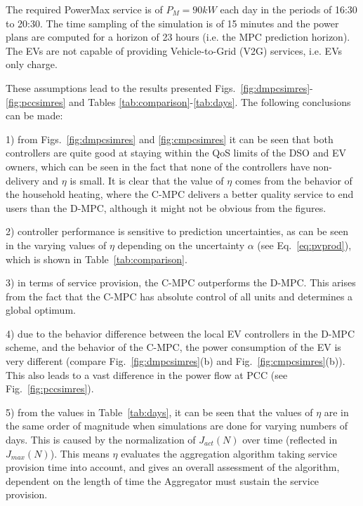 The required PowerMax service is of $P_M = 90kW $ each day in the periods of 16:30 to 20:30.
The time sampling of the simulation is of 15 minutes and the power plans are computed for a horizon of 23 hours (i.e. the MPC prediction horizon).
The EVs are not capable of providing Vehicle-to-Grid (V2G) services, i.e. EVs only charge.

These assumptions lead to the results presented Figs.~\ref{fig:dmpcsimres}-\ref{fig:pccsimres} and Tables \ref{tab:comparison}-\ref{tab:days}.
The following conclusions can be made:

1) from Figs.~\ref{fig:dmpcsimres} and \ref{fig:cmpcsimres} it can be seen that both controllers are quite good at staying within the QoS limits of the DSO and EV owners, which can be seen in the fact that none of the controllers have non-delivery and $\eta$ is small. It is clear that the value of $\eta$ comes from the behavior of the household heating, where the C-MPC delivers a better quality service to end users than the D-MPC, although it might not be obvious from the figures. %

2) controller performance is sensitive to prediction uncertainties, as can be seen in the varying values of $\eta$ depending on the uncertainty $\alpha$ (see Eq.~\eqref{eq:pvprod}), which is shown in Table~\ref{tab:comparison}.

3) in terms of service provision, the C-MPC outperforms the D-MPC. This arises from the fact that the C-MPC has absolute control of all units and determines a global optimum.

4) due to the behavior difference between the local EV controllers in the D-MPC scheme, and the behavior of the C-MPC, the power consumption of the EV is very different (compare Fig.~\ref{fig:dmpcsimres}(b) and Fig.~\ref{fig:cmpcsimres}(b)). This also leads to a vast difference in the power flow at PCC (see Fig.~\ref{fig:pccsimres}).

5) from the values in Table~\ref{tab:days}, it can be seen that the values of $\eta$ are in the same order of magnitude when simulations are done for varying numbers of days. This is caused by the normalization of $J_{act}(N)$ over time (reflected in $J_{max}(N)$). This means $\eta$ evaluates the aggregation algorithm taking service provision time into account, and gives an overall assessment of the algorithm, dependent on the length of time the Aggregator must sustain the service provision. %

